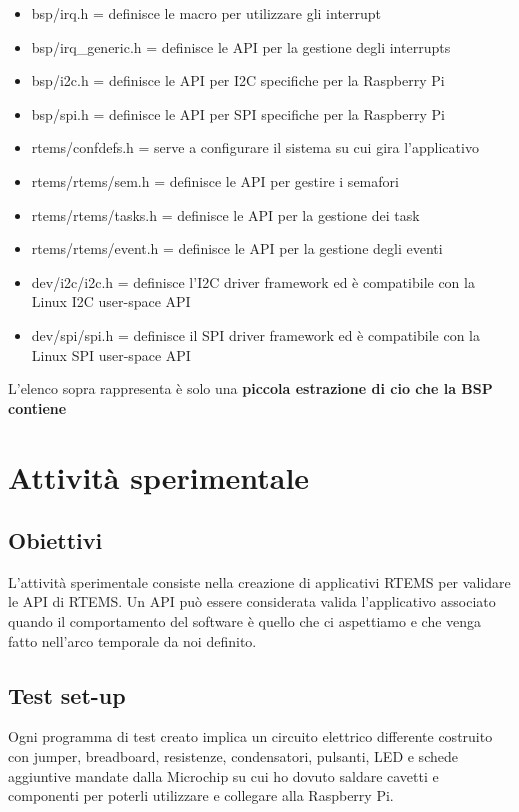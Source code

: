 \documentclass[12pt, a4paper, titlepage, oneside]{book}
\begin{document}
\begin{flushleft}
\begin{itemize}
    \item bsp/irq.h = definisce le macro per utilizzare gli interrupt
    \item bsp/irq\_generic.h = definisce le API per la gestione degli interrupts
    \item bsp/i2c.h = definisce le API per I2C specifiche per la Raspberry Pi
    \item bsp/spi.h = definisce le API per SPI specifiche per la Raspberry Pi
    \item rtems/confdefs.h = serve a configurare il sistema su cui gira l'applicativo
    \item rtems/rtems/sem.h = definisce le API per gestire i semafori
    \item rtems/rtems/tasks.h = definisce le API per la gestione dei task
    \item rtems/rtems/event.h = definisce le API per la gestione degli eventi
    \item dev/i2c/i2c.h = definisce l'I2C driver framework ed è compatibile con la Linux I2C user-space API
    \item dev/spi/spi.h =  definisce il SPI driver framework ed è compatibile con la Linux SPI user-space API
\end{itemize}
L'elenco sopra rappresenta è solo una\textbf{ piccola estrazione di cio che la BSP contiene} 
\chapter{Attività sperimentale}
\section{Obiettivi}
L'attività sperimentale consiste nella creazione di applicativi RTEMS per validare le API di RTEMS. Un API può essere considerata valida l'applicativo associato quando il comportamento del software è quello che ci aspettiamo e che venga fatto nell'arco temporale da noi definito.\\
\section{Test set-up}
Ogni programma di test creato implica un circuito elettrico differente costruito con jumper, breadboard, resistenze, condensatori, pulsanti, LED e schede aggiuntive mandate dalla Microchip su cui ho dovuto saldare cavetti e componenti per poterli utilizzare e collegare alla Raspberry Pi.\\


\end{flushleft}
\end{document}
